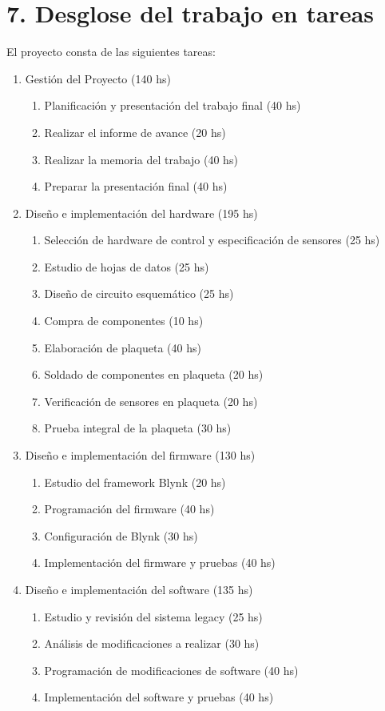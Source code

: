 \documentclass[
11pt, %
]{charter}
\begin{document}
\section{7. Desglose del trabajo en tareas}
\label{sec:wbs}

El proyecto consta de las siguientes tareas:

\begin{enumerate}
\item Gestión del Proyecto (140 hs)
	\begin{enumerate}
	\item Planificación y presentación del trabajo final (40 hs)
	\item Realizar el informe de avance (20 hs)
	\item Realizar la memoria del trabajo (40 hs)
	\item Preparar la presentación final (40 hs)
	\end{enumerate}
\item Diseño e implementación del hardware (195 hs)
	\begin{enumerate}
	\item Selección de hardware de control y especificación de sensores (25 hs)
	\item Estudio de hojas de datos (25 hs)
	\item Diseño de circuito esquemático (25 hs)
	\item Compra de componentes (10 hs)
	\item Elaboración de plaqueta (40 hs)
	\item Soldado de componentes en plaqueta (20 hs)
	\item Verificación de sensores en plaqueta (20 hs)
	\item Prueba integral de la plaqueta (30 hs)
	\end{enumerate}
\item Diseño e implementación del firmware (130 hs)
	\begin{enumerate}
	\item Estudio del framework Blynk (20 hs)
	\item Programación del firmware (40 hs)
	\item Configuración de Blynk (30 hs)
	\item Implementación del firmware y pruebas (40 hs)
	\end{enumerate}
\item Diseño e implementación del software (135 hs)
	\begin{enumerate}
	\item Estudio y revisión del sistema legacy (25 hs)
	\item Análisis de modificaciones a realizar (30 hs)
	\item Programación de modificaciones de software (40 hs)
	\item Implementación del software y pruebas (40 hs)
	\end{enumerate}
\end{enumerate}
\end{document}
